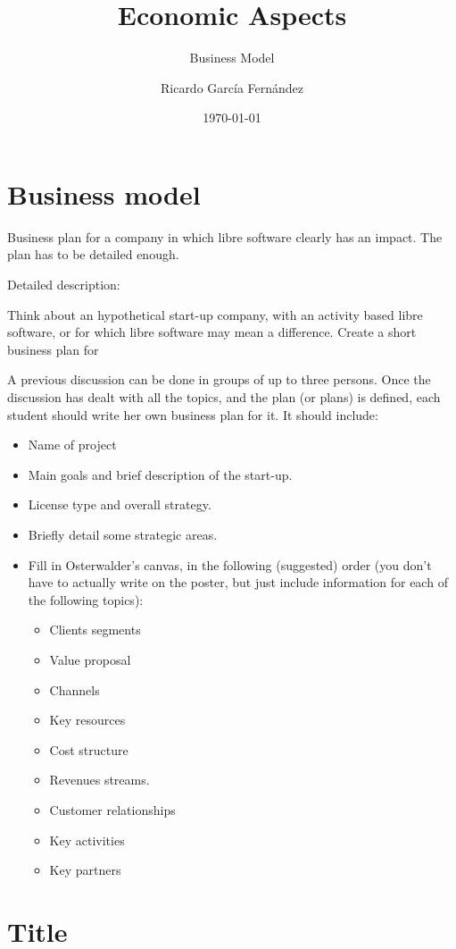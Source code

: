\documentclass[11pt]{scrartcl}
\title{\textbf{Economic Aspects}}
\subtitle{Business Model}
\author{Ricardo Garc\'ia Fern\'andez}
\date{\today}
\begin{document}
\maketitle

\section{Business model}

Business plan for a company in which libre software clearly has an impact. The plan has to be detailed enough. 

Detailed description:

Think about an hypothetical start-up company, with an activity based libre software, or for which libre software may mean a difference. Create a short business plan for 

A previous discussion can be done in groups of up to three persons. Once the discussion has dealt with all the topics, and the plan (or plans) is defined, each student should write her own business plan for it. It should include:

\begin{itemize}
    \item Name of project
    \item Main goals and brief description of the start-up.
    \item License type and overall strategy.
    \item Briefly detail some strategic areas.
    \item Fill in Osterwalder’s canvas, in the following (suggested) order (you don’t have to actually write on the poster, but just include information for each of the following topics):
    \begin{itemize}
        \item Clients segments
        \item Value proposal
        \item Channels
        \item Key resources
        \item Cost structure
        \item Revenues streams.
        \item Customer relationships
        \item Key activities
        \item Key partners
    \end{itemize}
\end{itemize}

\section{Title}
\end{document}
